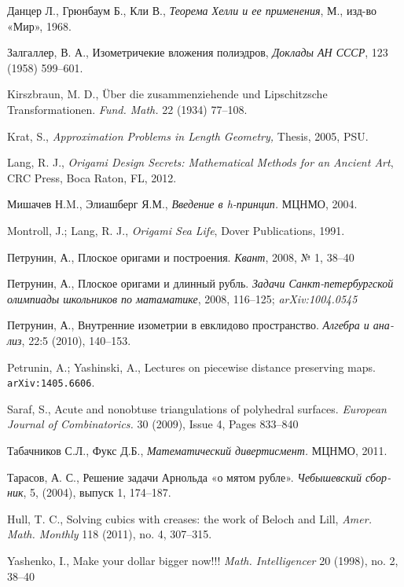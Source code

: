 \begin{thebibliography}{52}
Данцер Л., 
Грюнбаум Б., 
Кли В., 
\textit{Теорема Хелли и ее применения}, М., изд-во «Мир», 1968. 

\begin{otherlanguage}{russian}
Залгаллер, В. А.,
Изометричекие вложения полиэдров,
\textit{Доклады АН СССР},
123 (1958) 599--601.

 Kirszbraun, M. D., 
\"Uber die zusammenziehende und Lipschitzsche Transformationen. 
\textit{Fund. Math.} 22 (1934) 77--108.

 Krat, S., 
\textit{Approximation Problems in Length Geometry,} 
Thesis, 2005, PSU.

 Lang, R. J., 
\textit{Origami Design Secrets: Mathematical Methods for an Ancient Art},
CRC Press, Boca Raton, FL, 2012.

 Мишачев Н.M., Элиашберг Я.М., \textit{Введение в \textit{h}-принцип.} 
МЦНМО, 2004.


Montroll, J.;  
Lang, R. J., 
\textit{Origami Sea Life},
Dover Publications, 1991.

Петрунин, А., 
Плоское оригами и построения. 
\textit{Квант}, 2008, № 1, 38--40

\begin{otherlanguage}{russian}
Петрунин, А., 
Плоское оригами и длинный рубль.
\textit{Задачи Санкт-петербургской олимпиады школьников по матаматике}, 2008, 116--125; \textit{arXiv:1004.0545}
\end{otherlanguage}

Петрунин, А.,
Внутренние изометрии в евклидово пространство.
\textit{Алгебра и анализ}, 22:5 (2010),  140--153.

Petrunin, A.; 
Yashinski, A.,
Lectures on piecewise distance preserving maps.
\texttt{arXiv:1405.6606}.

  Saraf, S., 
Acute and nonobtuse triangulations of polyhedral surfaces.
\textit{European Journal of Combinatorics.} 
30 (2009), Issue 4, Pages 833--840

Табачников С.Л., Фукс Д.Б.,
\textit{Математический дивертисмент.} 
МЦНМО, 2011. 

\begin{otherlanguage}{russian}
Тарасов, А. С.,
Решение задачи Арнольда «о мятом рубле».
\textit{Чебышевский сборник},  
5, (2004), выпуск 1, 174--187.
\end{otherlanguage}

 Hull, T. C.,
Solving cubics with creases: the work of Beloch and Lill, 
\textit{Amer. Math. Monthly} 118 (2011), no. 4, 307--315.

 Yashenko, I.,
Make your dollar bigger now!!! 
\textit{Math. Intelligencer} 20 (1998), no. 2, 38--40


\end{otherlanguage}

\end{thebibliography}
